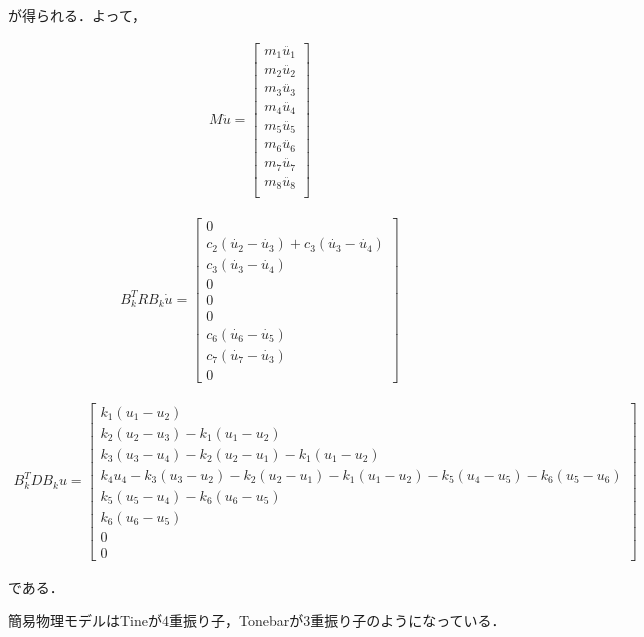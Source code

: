 が得られる．よって，

\begin{eqnarray}
    M\ddot{u} =
    \left[\begin{matrix}
        m_1 \ddot{u_1} \\
        m_2 \ddot{u_2} \\
        m_3 \ddot{u_3} \\
        m_4 \ddot{u_4} \\
        m_5 \ddot{u_5} \\
        m_6 \ddot{u_6} \\
        m_7 \ddot{u_7} \\
        m_8 \ddot{u_8} \\
    \end{matrix}\right]
\end{eqnarray}

\begin{eqnarray}
    B_k^T R B_k \dot{u} =
    \left[\begin{matrix}
        0 \\
        c_2 (\dot{u_2} - \dot{u_3}) + c_3 (\dot{u_3} - \dot{u_4}) \\
        c_3 (\dot{u_3} - \dot{u_4}) \\
        0 \\
        0 \\
        0 \\
        c_6 (\dot{u_6} - \dot{u_5}) \\
        c_7 (\dot{u_7} - \dot{u_3}) \\
        0
    \end{matrix}\right]
\end{eqnarray}

\begin{eqnarray}
    B_k^T D B_k u =
    \left[\begin{matrix}
        k_1 (u_1 - u_2) \\
        k_2 (u_2 - u_3) - k_1 (u_1 - u_2) \\
        k_3 (u_3 - u_4) - k_2 (u_2 - u_1) - k_1 (u_1 - u_2) \\
        k_4 u_4 - k_3 (u_3 - u_2) - k_2 (u_2 - u_1) - k_1 (u_1 - u_2) - k_5 (u_4 - u_5) - k_6 (u_5 - u_6) \\
        k_5 (u_5 - u_4) - k_6 (u_6 - u_5) \\
        k_6 (u_6 - u_5) \\
        0 \\
        0
    \end{matrix}\right]
\end{eqnarray}

である．

簡易物理モデルはTineが4重振り子，Tonebarが3重振り子のようになっている．

